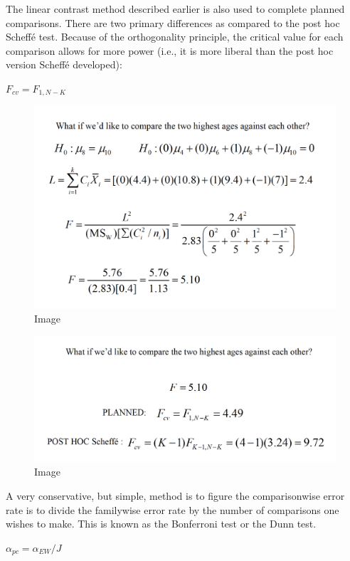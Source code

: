 \documentclass[]{book}
\theoremstyle{definition}
\theoremstyle{definition}
\theoremstyle{definition}
\theoremstyle{remark}
\begin{document}
The linear contrast method described earlier is also used to complete
planned comparisons. There are two primary differences as compared to
the post hoc Scheffé test. Because of the orthogonality principle, the
critical value for each comparison allows for more power (i.e., it is
more liberal than the post hoc version Scheffé developed):

\(F_{cv}=F_{1,N-K}\)

\begin{figure}
\centering
\includegraphics{img/hicksphc18.png}
\caption{Image}
\end{figure}

\begin{figure}
\centering
\includegraphics{img/hicksphc19.png}
\caption{Image}
\end{figure}

A very conservative, but simple, method is to figure the comparisonwise
error rate is to divide the familywise error rate by the number of
comparisons one wishes to make. This is known as the Bonferroni test or
the Dunn test.

\(\alpha_{pc}= \alpha_{EW}/J\)
\end{document}
